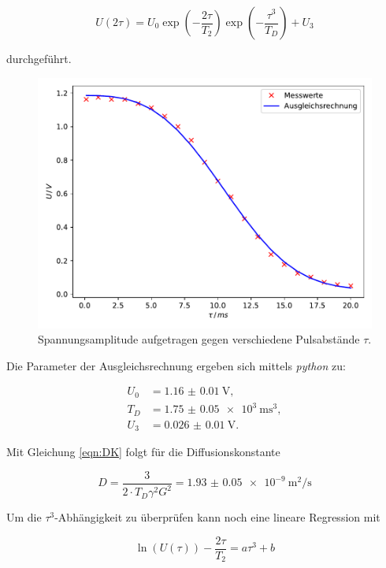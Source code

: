 \begin{equation*}
  U\left(2\tau\right) = U_0 \exp{\left(-\frac{2\tau}{T_2}\right)} \exp{\left(-\frac{\tau^3}{T_D}\right)} + U_3
\end{equation*}

durchgeführt. 

\begin{figure}
  \centering
  \includegraphics[scale=0.7]{content/plot4.pdf}
  \caption{Spannungsamplitude aufgetragen gegen verschiedene Pulsabstände $\tau$.}
  \label{fig:plot4}
\end{figure}

Die Parameter der Ausgleichsrechnung ergeben sich mittels \textit{python} zu:

\begin{align}
  U_0 &= \SI{1.16(1)}{\volt},\\
  T_D &= \SI{1.75(5)e3}{\milli\second^3},\\
  U_3 &= \SI{0.026(10)}{\volt}.
\end{align}

Mit Gleichung \eqref{eqn:DK} folgt für die Diffusionskonstante

\begin{equation*}
  D = \frac{3}{2\cdot T_D \gamma^2 G^2} = \SI{1.93(5)e-9}{\metre^2\per\second}
\end{equation*}

Um die $\tau^3$-Abhängigkeit zu überprüfen kann noch eine lineare Regression mit 

\begin{equation}
  \ln{\left(U\left(\tau\right)\right)}-\frac{2\tau}{T_2} = a\tau^3+b
\end{equation}


